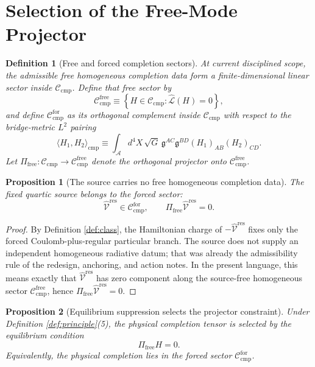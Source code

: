 \documentclass[11pt]{article}
\newcommand{\Sub}{\mathcal A}
\newcommand{\BridgeMetric}{\mathfrak g}
\newcommand{\ResidualLift}{\widehat{\mathcal V}^{\mathrm{res}}}
\newcommand{\SubReducedEin}{\widehat{\mathcal L}}
\newcommand{\FreeProj}{\Pi_{\mathrm{free}}}
\newcommand{\CompClass}{\mathscr C_{\mathrm{cmp}}}
\newcommand{\CompFree}{\mathscr C_{\mathrm{cmp}}^{\mathrm{free}}}
\newcommand{\CompForced}{\mathscr C_{\mathrm{cmp}}^{\mathrm{for}}}
\newtheorem{definition}{Definition}
\newtheorem{proposition}{Proposition}
\begin{document}
\section{Selection of the Free-Mode Projector}

\begin{definition}[Free and forced completion sectors]
\label{def:split}
At current disciplined scope, the admissible free homogeneous completion data form a finite-dimensional linear sector inside \(\CompClass\). Define that free sector by
\begin{equation}
\CompFree
\equiv
\left\{
H\in\CompClass:
\SubReducedEin(H)=0
\right\},
\label{eq:freeclass}
\end{equation}
and define \(\CompForced\) as its orthogonal complement inside \(\CompClass\) with respect to the bridge-metric \(L^2\) pairing
\begin{equation}
\langle H_1,H_2\rangle_{\mathrm{cmp}}
\equiv
\int_{\Sub} d^4X\,\sqrt{G}\,
\BridgeMetric^{AC}\BridgeMetric^{BD}
(H_1)_{AB}(H_2)_{CD}.
\label{eq:inner}
\end{equation}
Let \(\FreeProj:\CompClass\to\CompFree\) denote the orthogonal projector onto \(\CompFree\).
\end{definition}

\begin{proposition}[The source carries no free homogeneous completion data]
\label{prop:free}
The fixed quartic source belongs to the forced sector:
\begin{equation}
\ResidualLift\in\CompForced,
\qquad
\FreeProj\ResidualLift=0.
\label{eq:freesource}
\end{equation}
\end{proposition}

\begin{proof}
By Definition \ref{def:class}, the Hamiltonian charge of \(-\ResidualLift\) fixes only the forced Coulomb-plus-regular particular branch. The source does not supply an independent homogeneous radiative datum; that was already the admissibility rule of the redesign, anchoring, and action notes. In the present language, this means exactly that \(\ResidualLift\) has zero component along the source-free homogeneous sector \(\CompFree\), hence \(\FreeProj\ResidualLift=0\).
\end{proof}

\begin{proposition}[Equilibrium suppression selects the projector constraint]
\label{prop:proj}
Under Definition \ref{def:principle}(5), the physical completion tensor is selected by the equilibrium condition
\begin{equation}
\FreeProj H=0.
\label{eq:projzero}
\end{equation}
Equivalently, the physical completion lies in the forced sector \(\CompForced\).
\end{proposition}
\end{document}
